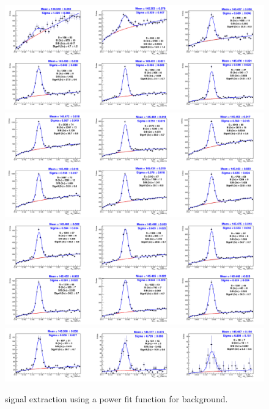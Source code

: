 \begin{figure}[!h]
\begin{center}
\includegraphics[width=1\textwidth]{figures/Dstar/pp13TeV/multi_trial/Mass_Spectra_PowerFuncBkg_1-4GeV.png} 
\includegraphics[width=1\textwidth]{figures/Dstar/pp13TeV/multi_trial/Mass_Spectra_PowerFuncBkg_4-7GeV.png}
\includegraphics[width=1\textwidth]{figures/Dstar/pp13TeV/multi_trial/Mass_Spectra_PowerFuncBkg_7-16GeV.png}
\includegraphics[width=1\textwidth]{figures/Dstar/pp13TeV/multi_trial/Mass_Spectra_PowerFuncBkg_16-50GeV-v2.png} 
\caption{\Dstar signal extraction using a power fit function for background.}
\label{fig:DstarYield_Powerbkg}
\end{center}
\end{figure}

